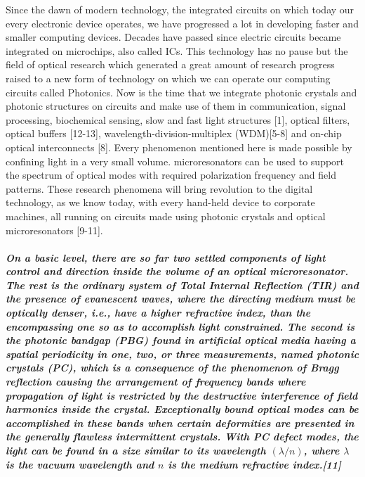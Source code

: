 \normalfont \large Since the dawn of modern technology, the integrated circuits on which today our every electronic device operates, we have progressed a lot in developing faster and smaller computing devices. Decades have passed since electric circuits became integrated on microchips, also called ICs. This technology has no pause but the field of optical research which generated a great amount of research progress raised to a new form of technology on which we can operate our computing circuits called Photonics. Now is the time that we integrate photonic crystals and photonic structures on circuits and make use of them in communication, signal processing, biochemical sensing, slow and fast light structures [1], optical filters, optical buffers [12-13], wavelength-division-multiplex (WDM)[5-8] and on-chip optical interconnects [8]. Every phenomenon mentioned here is made possible by confining light in a very small volume. microresonators can be used to support the spectrum of optical modes with required polarization frequency and field patterns. These research phenomena will bring revolution to the digital technology, as we know today, with every hand-held device to corporate machines, all running on circuits made using photonic crystals and optical microresonators [9-11]. 
\subparagraph{\normalfont \large On a basic level, there are so far two settled components of light control and direction inside the volume of an optical microresonator. The rest is the ordinary system of Total Internal Reflection (TIR) and the presence of evanescent waves, where the directing medium must be optically denser, i.e., have a higher refractive index, than the encompassing one so as to accomplish light constrained. The second is the photonic bandgap (PBG) found in artificial optical media having a spatial periodicity in one, two, or three measurements, named photonic crystals (PC), which is a consequence of the phenomenon of Bragg reflection causing the arrangement of frequency bands where propagation of light is restricted by the destructive interference of field harmonics inside the crystal. Exceptionally bound optical modes can be accomplished in these bands when certain deformities are presented in the generally flawless intermittent crystals. With PC defect modes, the light can be found in a size similar to its wavelength $(\lambda/n)$, where $\lambda$ is the vacuum wavelength and $n$ is the medium refractive index.[11]}

